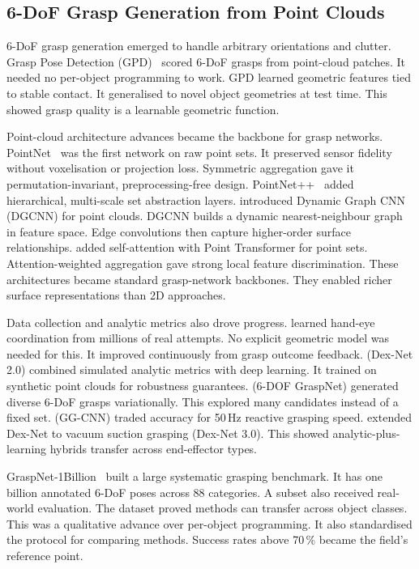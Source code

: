 \documentclass[oneside,studentpaper]{wbk}
\begin{document}
\subsection{6-DoF Grasp Generation from Point Clouds}
\label{sec:6dof-grasping}

6-DoF grasp generation emerged to handle arbitrary orientations and clutter. Grasp Pose Detection (GPD)~\cite{tenPas2017} scored 6-DoF grasps from point-cloud patches. It needed no per-object programming to work. GPD learned geometric features tied to stable contact. It generalised to novel object geometries at test time. This showed grasp quality is a learnable geometric function.

Point-cloud architecture advances became the backbone for grasp networks. PointNet~\cite{qi2017pointnet} was the first network on raw point sets. It preserved sensor fidelity without voxelisation or projection loss. Symmetric aggregation gave it permutation-invariant, preprocessing-free design. PointNet++~\cite{qi2017pointnet2} added hierarchical, multi-scale set abstraction layers. \cite{wang2019dgcnn} introduced Dynamic Graph CNN (DGCNN) for point clouds. DGCNN builds a dynamic nearest-neighbour graph in feature space. Edge convolutions then capture higher-order surface relationships. \cite{zhao2021point} added self-attention with Point Transformer for point sets. Attention-weighted aggregation gave strong local feature discrimination. These architectures became standard grasp-network backbones. They enabled richer surface representations than 2D approaches.

Data collection and analytic metrics also drove progress. \cite{levine2018learning} learned hand-eye coordination from millions of real attempts. No explicit geometric model was needed for this. It improved continuously from grasp outcome feedback. \cite{mahler2017dexnet} (Dex-Net 2.0) combined simulated analytic metrics with deep learning. It trained on synthetic point clouds for robustness guarantees. \cite{mousavian2019grasp} (6-DOF GraspNet) generated diverse 6-DoF grasps variationally. This explored many candidates instead of a fixed set. \cite{morrison2020learning} (GG-CNN) traded accuracy for 50\,Hz reactive grasping speed. \cite{mahler2018dexnet3} extended Dex-Net to vacuum suction grasping (Dex-Net 3.0). This showed analytic-plus-learning hybrids transfer across end-effector types.

GraspNet-1Billion~\cite{fang2020} built a large systematic grasping benchmark. It has one billion annotated 6-DoF poses across 88 categories. A subset also received real-world evaluation. The dataset proved methods can transfer across object classes. This was a qualitative advance over per-object programming. It also standardised the protocol for comparing methods. Success rates above 70\,\% became the field's reference point.
\end{document}
